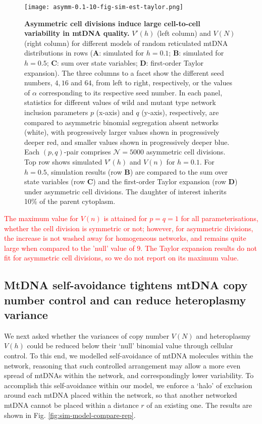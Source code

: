 \documentclass{article}
\begin{document}
\begin{figure}
\centering
\texttt{[image: asymm-0.1-10-fig-sim-est-taylor.png]}
\caption{\textbf{Asymmetric cell divisions induce large cell-to-cell variability in mtDNA quality.} $V'(h)$ (left column) and $V(N)$ (right column) for different models of random reticulated mtDNA distributions in rows (\textbf{A}: simulated for $h=0.1$; \textbf{B}: simulated for $h=0.5$; \textbf{C}: sum over state variables; \textbf{D}: first-order Taylor expansion). The three columns to a facet show the different seed numbers, $4, 16$ and $64$, from left to right, respectively, or the values of $\alpha$ corresponding to its respective seed number. In each panel, statistics for different values of wild and mutant type network inclusion parameters $p$ (x-axis) and $q$ (y-axis), respectively, are compared to asymmetric binomial segregation absent networks (white), with progressively larger values shown in progressively deeper red, and smaller values shown in progressively deeper blue. Each $(p,q)$-pair comprises $\mathcal{N}=5000$ asymmetric cell divisions. Top row shows simulated $V'(h)$ and $V(n)$ for $h=0.1$. For $h=0.5$, simulation results (row \textbf{B}) are compared to the sum over state variables (row \textbf{C}) and the first-order Taylor expansion (row \textbf{D}) under asymmetric cell divisions. The daughter of interest inherits 10\% of the parent cytoplasm.}\label{fig:sim-model-compare-nonrep-10}
\end{figure}
\textcolor{red}{The maximum value for $V(n)$ is attained for $p=q=1$ for all parameterisations, whether the cell division is symmetric or not; however, for asymmetric divisions, the increase is not washed away for homogeneous networks, and remains quite large when compared to the 'null' value of $9$. The Taylor expansion results do not fit for asymmetric cell divisions, so we do not report on its maximum value.}

\subsection{MtDNA self-avoidance tightens mtDNA copy number control and can reduce heteroplasmy variance}
We next asked whether the variances of copy number $V(N)$ and heteroplasmy $V(h)$ could be reduced below their `null' binomial value through cellular control. To this end, we modelled self-avoidance of mtDNA molecules within the network, reasoning that such controlled arrangement may allow a more even spread of mtDNAs within the network, and correspondingly lower variability. To accomplish this self-avoidance within our model, we enforce a `halo' of exclusion around each mtDNA placed within the network, so that another networked mtDNA cannot be placed within a distance $r$ of an existing one. The results are shown in Fig. \ref{fig:sim-model-compare-rep}. 
\end{document}
